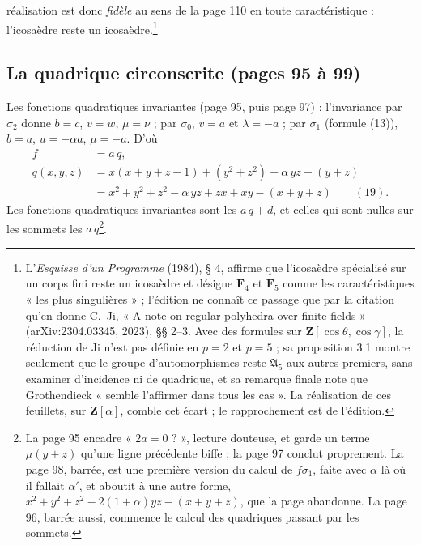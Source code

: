 \documentclass[11pt,a4paper]{article}
\begin{document}
réalisation est donc \emph{fidèle} au sens de la page 110 en toute
caractéristique : l'icosaèdre reste un icosaèdre.\footnote{L'\emph{Esquisse
d'un Programme} (1984), § 4, affirme que l'icosaèdre spécialisé sur un corps
fini reste un icosaèdre et désigne $\mathbf{F}_4$ et $\mathbf{F}_5$ comme les
caractéristiques « les plus singulières » ; l'édition ne connaît ce passage
que par la citation qu'en donne C.~Ji, « A note on regular polyhedra over
finite fields » (arXiv:2304.03345, 2023), §§ 2--3. Avec des formules sur
$\mathbf{Z}[\cos\theta, \cos\gamma]$, la réduction de Ji n'est pas définie en
$p = 2$ et $p = 5$ ; sa proposition 3.1 montre seulement que le groupe
d'automorphismes reste $\mathfrak{A}_5$ aux autres premiers, sans examiner
d'incidence ni de quadrique, et sa remarque finale note que Grothendieck
« semble l'affirmer dans tous les cas ». La réalisation de ces feuillets, sur
$\mathbf{Z}[\alpha]$, comble cet écart ; le rapprochement est de l'édition.}

\subsection*{La quadrique circonscrite (pages 95 à 99)}

Les fonctions quadratiques invariantes (page 95, puis page 97) : l'invariance
par $\sigma_2$ donne $b = c$, $v = w$, $\mu = \nu$ ; par $\sigma_0$, $v = a$ et
$\lambda = -a$ ; par $\sigma_1$ (formule (13)), $b = a$, $u = -\alpha a$, $\mu =
-a$. D'où
\[
\begin{aligned}
f &= a\,q, \\
q(x, y, z) &= x(x + y + z - 1) + (y^2 + z^2) - \alpha\,yz - (y + z) \\
&= x^2 + y^2 + z^2 - \alpha\,yz + zx + xy - (x + y + z) \qquad (19) .
\end{aligned}
\]
Les fonctions quadratiques invariantes sont les $a\,q + d$, et celles qui sont
nulles sur les sommets les $a\,q$\footnote{La page 95 encadre « $2a = 0$ ? »,
lecture douteuse, et garde un terme $\mu(y + z)$ qu'une ligne précédente
biffe ; la page 97 conclut proprement. La page 98, barrée, est une première
version du calcul de $f\sigma_1$, faite avec $\alpha$ là où il fallait
$\alpha'$, et aboutit à une autre forme, $x^2 + y^2 + z^2 - 2(1 + \alpha)yz - (x
+ y + z)$, que la page abandonne. La page 96, barrée aussi, commence le calcul
des quadriques passant par les sommets.}.
\end{document}
